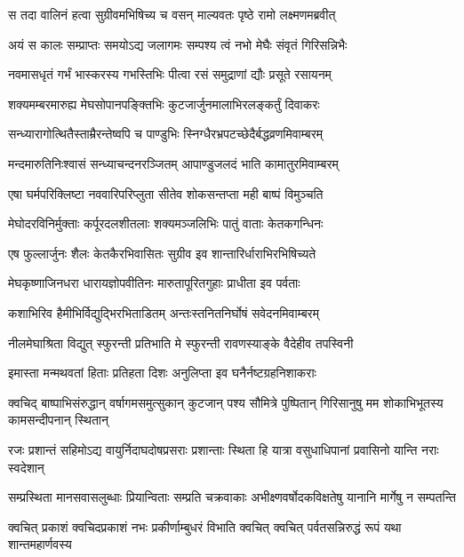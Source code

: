 
\twolineshloka
{स तदा वालिनं हत्वा सुग्रीवमभिषिच्य च}
{वसन् माल्यवतः पृष्ठे रामो लक्ष्मणमब्रवीत्} %

\twolineshloka
{अयं स कालः सम्प्राप्तः समयोऽद्य जलागमः}
{सम्पश्य त्वं नभो मेघैः संवृतं गिरिसन्निभैः} %

\twolineshloka
{नवमासधृतं गर्भं भास्करस्य गभस्तिभिः}
{पीत्वा रसं समुद्राणां द्यौः प्रसूते रसायनम्} %

\twolineshloka
{शक्यमम्बरमारुह्य मेघसोपानपङ्क्तिभिः}
{कुटजार्जुनमालाभिरलङ्कर्तुं दिवाकरः} %

\twolineshloka
{सन्ध्यारागोत्थितैस्ताम्रैरन्तेष्वपि च पाण्डुभिः}
{स्निग्धैरभ्रपटच्छेदैर्बद्धव्रणमिवाम्बरम्} %

\twolineshloka
{मन्दमारुतिनिःश्वासं सन्ध्याचन्दनरञ्जितम्}
{आपाण्डुजलदं भाति कामातुरमिवाम्बरम्} %

\twolineshloka
{एषा घर्मपरिक्लिष्टा नववारिपरिप्लुता}
{सीतेव शोकसन्तप्ता मही बाष्पं विमुञ्चति} %

\twolineshloka
{मेघोदरविनिर्मुक्ताः कर्पूरदलशीतलाः}
{शक्यमञ्जलिभिः पातुं वाताः केतकगन्धिनः} %

\twolineshloka
{एष फुल्लार्जुनः शैलः केतकैरभिवासितः}
{सुग्रीव इव शान्तारिर्धाराभिरभिषिच्यते} %

\twolineshloka
{मेघकृष्णाजिनधरा धारायज्ञोपवीतिनः}
{मारुतापूरितगुहाः प्राधीता इव पर्वताः} %

\twolineshloka
{कशाभिरिव हैमीभिर्विद्युद्भिरभिताडितम्}
{अन्तःस्तनितनिर्घोषं सवेदनमिवाम्बरम्} %

\twolineshloka
{नीलमेघाश्रिता विद्युत् स्फुरन्ती प्रतिभाति मे}
{स्फुरन्ती रावणस्याङ्के वैदेहीव तपस्विनी} %

\twolineshloka
{इमास्ता मन्मथवतां हिताः प्रतिहता दिशः}
{अनुलिप्ता इव घनैर्नष्टग्रहनिशाकराः} %

\threelineshloka
{क्वचिद् बाष्पाभिसंरुद्धान् वर्षागमसमुत्सुकान्}
{कुटजान् पश्य सौमित्रे पुष्पितान् गिरिसानुषु}
{मम शोकाभिभूतस्य कामसन्दीपनान् स्थितान्} %

\twolineshloka
{रजः प्रशान्तं सहिमोऽद्य वायुर्निदाघदोषप्रसराः प्रशान्ताः}
{स्थिता हि यात्रा वसुधाधिपानां प्रवासिनो यान्ति नराः स्वदेशान्} %

\twolineshloka
{सम्प्रस्थिता मानसवासलुब्धाः प्रियान्विताः सम्प्रति चक्रवाकाः}
{अभीक्ष्णवर्षोदकविक्षतेषु यानानि मार्गेषु न सम्पतन्ति} %

\twolineshloka
{क्वचित् प्रकाशं क्वचिदप्रकाशं नभः प्रकीर्णाम्बुधरं विभाति}
{क्वचित् क्वचित् पर्वतसन्निरुद्धं रूपं यथा शान्तमहार्णवस्य} %

